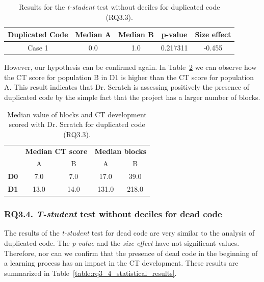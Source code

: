\begin{table}
 \begin{center}
  \begin{tabular}{|c|c|c|c|c|}
    \hline
    \textbf{Duplicated Code} & \textbf{Median A} & \textbf{Median B} & \textbf{p-value} & \textbf{Size effect} \\ \hline
    Case 1 & 0.0 & 1.0 & 0.217311 & -0.455 \\ \hline
  \end{tabular}
  \caption{Results for the \textit{t-student} test without deciles for duplicated code (RQ3.3).}
  \label{table:rq3_3_statistical_results}
 \end{center}
\end{table}


However, our hypothesis can be confirmed again. In Table~\ref{table:rq3_3_statistical_results_median} we can observe how the CT score for population B in D1 is higher than the CT score for population A. This result indicates that Dr. Scratch is assessing positively the presence of duplicated code by the simple fact that the project has a larger number of blocks.

\begin{table}
 \begin{center}
  \begin{tabular}{|c|c|c|c|c|}
    \cline{2-5}
     \multicolumn{1}{c}{} & 
     \multicolumn{2}{|c|}{\textbf{Median CT score}} & \multicolumn{2}{|c|}{\textbf{Median blocks}} \\
     \cline{2-5}
     \multicolumn{1}{c|}{} & A & B & A & B \\ \hline
     \textbf{D0} & 7.0 & 7.0 & 17.0 & 39.0 \\ \hline
     \textbf{D1} & 13.0 & 14.0 & 131.0 & 218.0 \\ \hline
  \end{tabular}
  \caption{Median value of blocks and CT development scored with Dr. Scratch for duplicated code (RQ3.3).}
  \label{table:rq3_3_statistical_results_median}
 \end{center}
\end{table}



\subsubsection{RQ3.4. \textit{T-student} test without deciles for dead code}
\label{subsubsec:RQ3_4_statistical_results}

The results of the \textit{t-student} test for dead code are very similar to the analysis of duplicated code. The \textit{p-value} and the \textit{size effect} have not significant values. Therefore, nor can we confirm that the presence of dead code in the beginning of a learning process has an impact in the CT development. These results are summarized in Table~\ref{table:rq3_4_statistical_results}.

